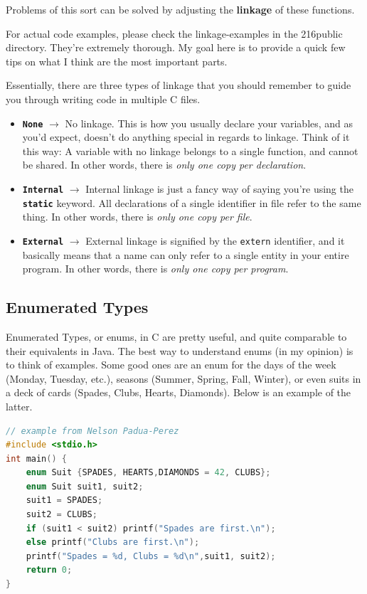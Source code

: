 \documentclass[english, 10pt]{article}
\begin{document}
Problems of this sort can be solved by adjusting the \textbf{linkage} of these functions.\newline

For actual code examples, please check the linkage-examples in the 216public directory. They're extremely thorough. My goal here is to provide a quick few tips on what I think are the most important parts.\newline

Essentially, there are three types of linkage that you should remember to guide you through writing code in multiple C files.

\begin{itemize}
	\item \textbf{\texttt{None}} $\rightarrow$ No linkage. This is how you usually declare your variables, and as you'd expect, doesn't do anything special in regards to linkage. Think of it this way: A variable with no linkage belongs to a single function, and cannot be shared. In other words, there is \textit{only one copy per declaration}.
	\item \textbf{\texttt{Internal}} $\rightarrow$ Internal linkage is just a fancy way of saying you're using the \textbf{\texttt{static}} keyword. All declarations of a single identifier in file refer to the same thing. In other words, there is \textit{only one copy per file}.
	\item \textbf{\texttt{External}} $\rightarrow$ External linkage is signified by the \texttt{extern} identifier, and it basically means that a name can only refer to a single entity in your entire program. In other words, there is \textit{only one copy per program}.
\end{itemize}

\subsection{Enumerated Types}

Enumerated Types, or enums, in C are pretty useful, and quite comparable to their equivalents in Java. The best way to understand enums (in my opinion) is to think of examples. Some good ones are an enum for the days of the week (Monday, Tuesday, etc.), seasons (Summer, Spring, Fall, Winter), or even suits in a deck of cards (Spades, Clubs, Hearts, Diamonds). Below is an example of the latter.

{\centering
\begin{lstlisting}[language=C]
// example from Nelson Padua-Perez
#include <stdio.h>
int main() {
	enum Suit {SPADES, HEARTS,DIAMONDS = 42, CLUBS};
	enum Suit suit1, suit2;
	suit1 = SPADES;
	suit2 = CLUBS;
	if (suit1 < suit2) printf("Spades are first.\n");
	else printf("Clubs are first.\n");
	printf("Spades = %d, Clubs = %d\n",suit1, suit2);
	return 0;
}
\end{lstlisting}
}
\end{document}

